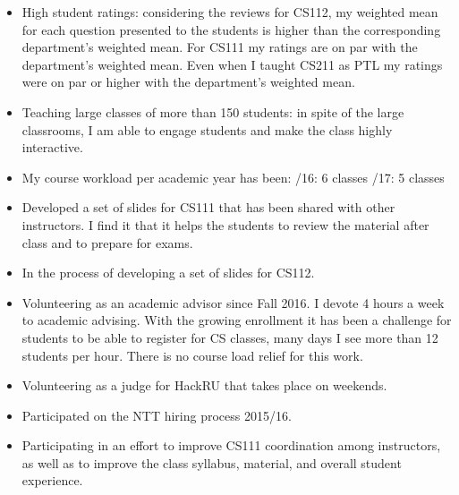 \documentclass[11pt]{article}
\begin{document}
\begin{itemize}
\item High student ratings: considering the reviews for CS112, my
  weighted mean for each question presented to the students is higher
  than the corresponding department's weighted mean. For CS111 my
  ratings are on par with the department's weighted mean. Even when I
  taught CS211 as PTL my ratings were on par or higher with the
  department's weighted mean.
\item Teaching large classes of more than 150 students: in spite of
  the large classrooms, I am able to engage students and make the class
  highly interactive.
\item My course workload per academic year has been:
  /16: 6 classes 
  /17: 5 classes
\item Developed a set of slides for CS111 that has been shared with
  other instructors. I find it that it helps the students to review the
  material after class and to prepare for exams.
\item In the process of developing a set of slides for CS112.
\item Volunteering as an academic advisor since Fall 2016. I devote 4
  hours a week to academic advising. With the growing enrollment it
  has been a challenge for students to be able to register for CS
  classes, many days I see more than 12 students per hour. There is no
  course load relief for this work.
\item Volunteering as a judge for HackRU that takes place on weekends.
\item Participated on the NTT hiring process 2015/16.
\item Participating in an effort to improve CS111 coordination among
  instructors, as well as to improve the class syllabus, material, and
  overall student experience.
\end{itemize}
\end{document}
